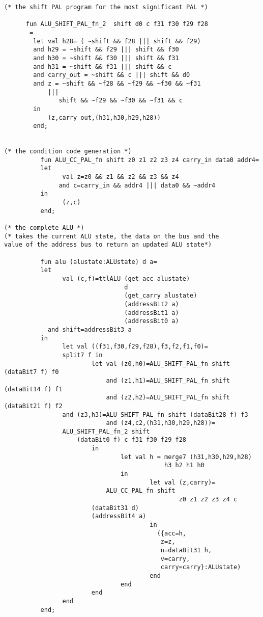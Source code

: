 \begin{verbatim}
(* the shift PAL program for the most significant PAL *)

	  fun ALU_SHIFT_PAL_fn_2  shift d0 c f31 f30 f29 f28
	   =
		let val h28= ( ~shift && f28 ||| shift && f29) 
		and h29 = ~shift && f29 ||| shift && f30
		and h30 = ~shift && f30 ||| shift && f31
		and h31 = ~shift && f31 ||| shift && c
		and carry_out = ~shift && c ||| shift && d0
		and z = ~shift && ~f28 && ~f29 && ~f30 && ~f31
			|||
		       shift && ~f29 && ~f30 && ~f31 && c
		in
			(z,carry_out,(h31,h30,h29,h28))
		end;


(* the condition code generation *)
          fun ALU_CC_PAL_fn shift z0 z1 z2 z3 z4 carry_in data0 addr4=
          let
                val z=z0 && z1 && z2 && z3 && z4
               and c=carry_in && addr4 ||| data0 && ~addr4
          in
                (z,c)
          end;

(* the complete ALU *)
(* takes the current ALU state, the data on the bus and the 
value of the address bus to return an updated ALU state*)

          fun alu (alustate:ALUstate) d a=
          let
                val (c,f)=ttlALU (get_acc alustate)
                                 d
                                 (get_carry alustate)
                                 (addressBit2 a)
                                 (addressBit1 a)
                                 (addressBit0 a)
          	and shift=addressBit3 a
          in 
                let val ((f31,f30,f29,f28),f3,f2,f1,f0)=
				split7 f in
                        let val (z0,h0)=ALU_SHIFT_PAL_fn shift (dataBit7 f) f0
                            and (z1,h1)=ALU_SHIFT_PAL_fn shift (dataBit14 f) f1
                            and (z2,h2)=ALU_SHIFT_PAL_fn shift (dataBit21 f) f2
			    and (z3,h3)=ALU_SHIFT_PAL_fn shift (dataBit28 f) f3
                            and (z4,c2,(h31,h30,h29,h28))=
				ALU_SHIFT_PAL_fn_2 shift 
					(dataBit0 f) c f31 f30 f29 f28
                        in
                                let val h = merge7 (h31,h30,h29,h28) 
                                            h3 h2 h1 h0
                                in
                                        let val (z,carry)=
          					ALU_CC_PAL_fn shift
                                                z0 z1 z2 z3 z4 c
						(dataBit31 d)
						(addressBit4 a)
                                        in
                                          ({acc=h,
                                           z=z,
                                           n=dataBit31 h,
                                           v=carry,
                                           carry=carry}:ALUstate)
                                        end
                                end
                        end
                end
          end;
\end{verbatim}
